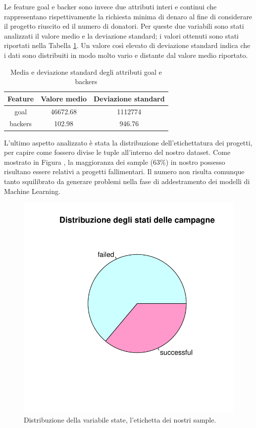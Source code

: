 Le feature goal e backer sono invece due attributi interi e continui che rappresentano rispettivamente la richiesta minima di denaro al fine di considerare il progetto riuscito ed il numero di donatori. Per queste due variabili sono stati analizzati il valore medio e la deviazione standard; i valori ottenuti sono stati riportati nella Tabella \ref{tab:meansdgoalbackers}. Un valore così elevato di deviazione standard indica che i dati sono distribuiti in modo molto vario e distante dal valore medio riportato.
\begin{table}
	\centering
	\label{tab:meansdgoalbackers}
	\caption{Media e deviazione standard degli attributi goal e backers}
	\begin{tabular}{|c|c|c|}
		\hline 
		\textbf{Feature} & \textbf{Valore medio} & \textbf{Deviazione standard} \\ 
		\hline 
		goal & 46672.68 & 1112774 \\ 
		\hline 
		backers & 102.98 & 946.76 \\ 
		\hline 
	\end{tabular} 
\end{table}


L'ultimo aspetto analizzato è stata la distribuzione dell'etichettatura dei progetti, per capire come fossero divise le tuple all'interno del nostro dataset. Come mostrato in Figura , la maggioranza dei sample (63\%) in nostro possesso risultano essere relativi a progetti fallimentari. Il numero non risulta comunque tanto squilibrato da generare problemi nella fase di addestramento dei modelli di Machine Learning.

\begin{figure}
	\centering
	\includegraphics[width=0.8\linewidth]{../FinalResults/Images/Data_exploration_plots/pie_state}
	\caption{Distribuzione della variabile state, l'etichetta dei nostri sample.}
	\label{fig:piestate}
\end{figure}


